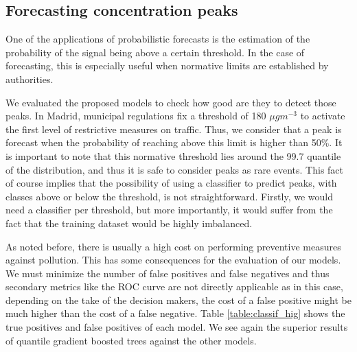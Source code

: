 \documentclass[a4paper,3p,sort&compress]{elsarticle}
\begin{document}
\subsection{Forecasting \no concentration peaks}

One of the applications of probabilistic forecasts is the estimation
of the probability of the signal being above a certain threshold. In
the case of \no forecasting, this is especially useful when normative
limits are established by authorities.

We evaluated the proposed models to check how good are they to detect
those peaks.  In Madrid, municipal regulations fix a threshold of 180
$\mu gm^{-3}$ to activate the first level of restrictive measures on
traffic. Thus, we consider that a \no peak is forecast when the
probability of reaching above this limit is higher than 50\%.  It is
important to note that this normative threshold lies around the 99.7
quantile of the \no distribution, and thus it is safe to consider
peaks as rare events.
This fact of course implies that the possibility of using a classifier
to predict peaks, with classes above or below the threshold, is not
straightforward. Firstly, we would need a classifier per threshold,
but more importantly, it would suffer from the fact that the training
dataset would be highly imbalanced.

As noted before, there is usually a high cost on performing preventive
measures against pollution. This has some consequences for the
evaluation of our models. We must minimize the number of false
positives and false negatives and thus secondary metrics like the ROC
curve are not directly applicable as in this case, depending on the
take of the decision makers, the cost of a false positive might be
much higher than the cost of a false negative. Table
\ref{table:classif_hig} shows the true positives and false positives
of each model. We see again the superior results of quantile gradient
boosted trees against the other models.
\end{document}
